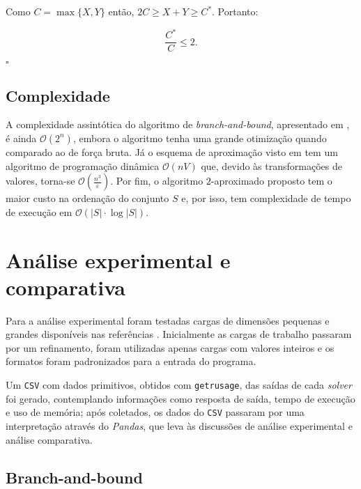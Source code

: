 \documentclass[12pt]{article}
\begin{document}
Como \(C=\max\{X,Y\}\) então, \(2C \geq X+Y \geq C^*\). Portanto:

\vspace{-0.7cm}

\[\frac{C^*}{C} \leq 2.\]

\begin{flushright}
    \(\square\)
\end{flushright}

\vspace{-0.7cm}


\subsection{Complexidade}

A complexidade assintótica do algoritmo de \textit{branch-and-bound}, apresentado em \cite{levitin}, é ainda \(\mathcal{O}(2^n)\), embora o algoritmo tenha uma grande otimização quando comparado ao de força bruta. Já o esquema de aproximação visto em \cite{kt} tem um algoritmo de programação dinâmica \(\mathcal{O}(nV)\) que, devido às transformações de valores, torna-se \(\mathcal{O}\left(\frac{n^3}{\varepsilon}\right)\). Por fim, o algoritmo \(2\)-aproximado proposto tem o maior custo na ordenação do conjunto \(S\) e, por isso, tem complexidade de tempo de execução em \(\mathcal{O}(|S| \cdot \log |S|)\).


\section{Análise experimental e comparativa}

Para a análise experimental foram testadas cargas de dimensões pequenas e grandes disponíveis nas referências \cite{knp1} \cite{knp2}. Inicialmente as cargas de trabalho passaram por um refinamento, foram utilizadas apenas cargas com valores inteiros e os formatos foram padronizados para a entrada do programa.

Um \texttt{CSV} com dados primitivos, obtidos com \texttt{getrusage}, das saídas de cada \textit{solver} foi gerado, contemplando informações como resposta de saída, tempo de execução e uso de memória; após coletados, os dados do \texttt{CSV} passaram por uma interpretação através do \textit{Pandas}, que leva às discussões de análise experimental e análise comparativa.

\subsection{Branch-and-bound}
\end{document}
